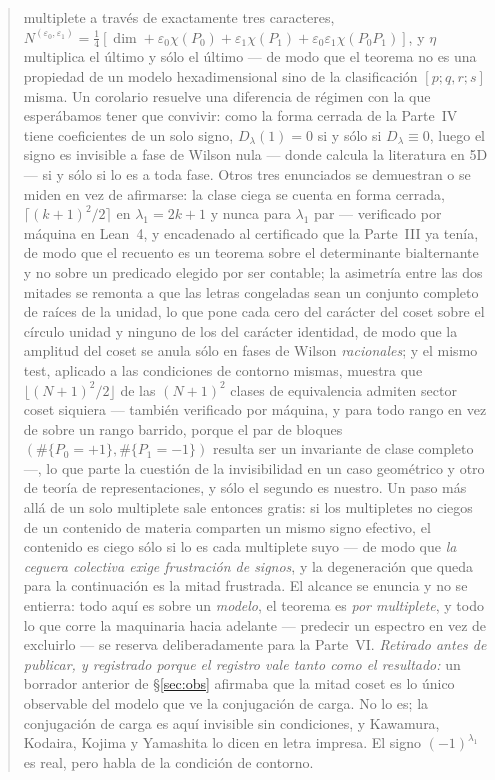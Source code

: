 \documentclass[11pt,a4paper]{article}
\newcommand{\Dl}{D_\lambda}
\begin{document}
\begin{abstract}
multiplete a través de exactamente tres caracteres,
$N^{(\varepsilon_0,\varepsilon_1)}=\frac14[\dim+\varepsilon_0\chi(P_0)+\varepsilon_1\chi(P_1)
+\varepsilon_0\varepsilon_1\chi(P_0P_1)]$, y $\eta$ multiplica el último y sólo el último ---
de modo que el teorema no es una propiedad de un modelo hexadimensional sino de la clasificación
$[p;q,r;s]$ misma. Un corolario resuelve una diferencia de régimen con la que esperábamos tener
que convivir: como la forma cerrada de la Parte~IV tiene coeficientes de un solo signo, $\Dl(1)=0$ si
y sólo si $\Dl\equiv0$, luego el signo es invisible a fase de Wilson nula --- donde calcula la
literatura en 5D --- si y sólo si lo es a toda fase. Otros tres enunciados se demuestran o se miden
en vez de afirmarse: la clase ciega se cuenta en forma cerrada, $\lceil(k+1)^2/2\rceil$ en
$\lambda_1=2k+1$ y nunca para $\lambda_1$ par --- verificado por máquina en Lean~4, y encadenado al
certificado que la Parte~III ya tenía, de modo que el recuento es un teorema sobre el determinante
bialternante y no sobre un predicado elegido por ser contable; la asimetría entre las dos mitades se
remonta a que las letras congeladas sean un conjunto completo de raíces de la unidad, lo que pone
cada cero del carácter del coset sobre el círculo unidad y ninguno de los del carácter identidad, de
modo que la amplitud del coset se anula sólo en fases de Wilson \emph{racionales}; y el mismo test,
aplicado a las condiciones de contorno mismas, muestra que $\lfloor(N+1)^2/2\rfloor$ de las
$(N+1)^2$ clases de equivalencia admiten sector coset siquiera --- también verificado por máquina, y
para todo rango en vez de sobre un rango barrido, porque el par de bloques
$(\#\{P_0{=}{+}1\},\#\{P_1{=}{-}1\})$ resulta ser un invariante de clase completo ---, lo que parte
la cuestión de la invisibilidad en un caso geométrico y otro de teoría de representaciones, y sólo el
segundo es nuestro. Un paso más allá de un solo multiplete sale entonces gratis: si los multipletes
no ciegos de un contenido de materia comparten un mismo signo efectivo, el contenido es ciego sólo si
lo es cada multiplete suyo --- de modo que \emph{la ceguera colectiva exige frustración de signos}, y
la degeneración que queda para la continuación es la mitad frustrada. El alcance se enuncia y no se
entierra: todo aquí es sobre un \emph{modelo}, el teorema es \emph{por multiplete}, y todo lo que corre la maquinaria hacia adelante --- predecir un espectro en
vez de excluirlo --- se reserva deliberadamente para la Parte~VI. \emph{Retirado antes de publicar, y
registrado porque el registro vale tanto como el resultado:} un borrador anterior de
\S\ref{sec:obs} afirmaba que la mitad coset es lo único observable del modelo que ve la
conjugación de carga. No lo es; la conjugación de carga es aquí invisible sin condiciones, y
Kawamura, Kodaira, Kojima y Yamashita lo dicen en letra impresa. El signo $(-1)^{\lambda_1}$ es real,
pero habla de la condición de contorno.
\end{abstract}
\end{document}

